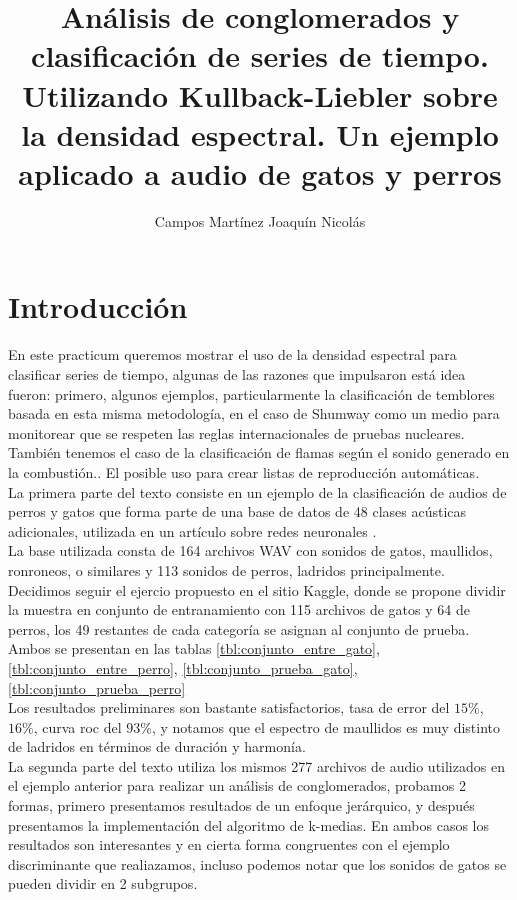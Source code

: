 \documentclass[twocolumn,10pt]{asme2ej}
\title{An\'alisis de conglomerados y clasificaci\'on de series de tiempo. Utilizando Kullback-Liebler sobre la densidad espectral. Un ejemplo aplicado a audio de gatos y perros}
\author{Campos Mart\'inez Joaqu\'in Nicol\'as
    \affiliation{
	Alumno de Actuar\'ia\\
	Facultad de Ciencias Actuariales\\
	Universidad An\'ahuac Campus Norte\\
    }	
}
\begin{document}
\maketitle 
\section*{Introducci\'on} %
\label{sec:introduccion}
En este practicum queremos mostrar el uso de la densidad espectral para clasificar series de tiempo, algunas de las razones que impulsaron está idea fueron: primero, algunos ejemplos, particularmente la clasificación de temblores basada en esta misma metodología\cite{SUBJ_SP1}\cite{SUBJ_SP2}, en el caso de Shumway como un medio para monitorear que se respeten las reglas internacionales de pruebas nucleares. Tambi\'en tenemos el caso de la clasificaci\'on de flamas seg\'un el sonido generado en la combusti\'on.\cite{SUBJ_SP3}. El posible uso para crear listas de reproducci\'on autom\'aticas.\\

La primera parte del texto consiste en un ejemplo de la clasificaci\'on de audios de perros y gatos que forma parte de una base de datos de 48 clases ac\'usticas adicionales, utilizada en un art\'iculo sobre redes neuronales \cite{DATOS}.\\

La base utilizada consta de 164 archivos WAV con sonidos de gatos, maullidos, ronroneos, o similares y 113 sonidos de perros, ladridos principalmente. Decidimos seguir el ejercio propuesto en el sitio Kaggle\cite{DATOS2}, donde se propone dividir la muestra en conjunto de entranamiento con 115 archivos de gatos y 64 de perros, los 49 restantes de cada categor\'ia se asignan al conjunto de prueba. Ambos se presentan en las tablas \ref{tbl:conjunto_entre_gato}, \ref{tbl:conjunto_entre_perro}, \ref{tbl:conjunto_prueba_gato}, \ref{tbl:conjunto_prueba_perro}\\

Los resultados preliminares son bastante satisfactorios, tasa de error del $15\%$, $16\%$, curva roc del $93\%$, y notamos que el espectro de maullidos es muy distinto de ladridos en t\'erminos de duraci\'on y harmon\'ia.\\

La segunda parte del texto utiliza los mismos 277 archivos de audio utilizados en el ejemplo anterior para realizar un an\'alisis de conglomerados, probamos 2 formas, primero presentamos resultados de un enfoque jer\'arquico, y despu\'es presentamos la implementaci\'on del algoritmo de k-medias. En ambos casos los resultados son interesantes y en cierta forma congruentes con el ejemplo discriminante que realiazamos, incluso podemos notar que los sonidos de gatos se pueden dividir en 2 subgrupos.\\
\end{document}
